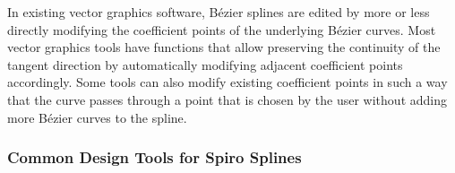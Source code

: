 \documentclass[a4paper]{article}
\begin{document}
				In existing vector graphics software, Bézier splines are edited by more or less directly modifying the coefficient points of the underlying Bézier curves. Most vector graphics tools have functions that allow preserving the continuity of the tangent direction by automatically modifying adjacent coefficient points accordingly. Some tools can also modify existing coefficient points in such a way that the curve passes through a point that is chosen by the user without adding more Bézier curves to the spline.


			\subsubsection{Common Design Tools for Spiro Splines}

\end{document}
